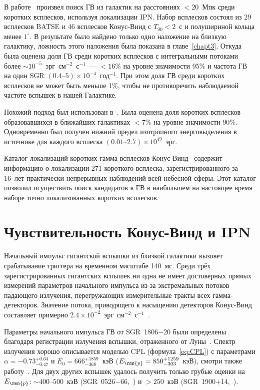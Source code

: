 В работе~\citep{Ofek2007} произвел поиск ГВ из галактик на расстояниях $<20$~Мпк 
среди коротких всплесков, используя локализации IPN. Набор всплесков состоял из 
29 всплесков BATSE и 46 всплесков Конус-Винд с $T_{90}<2$~с и полушириной кольца 
менее $1^{\circ}$. В результате было найдено только одно наложение на близкую 
галактику, ложность этого наложения была показана в главе~\ref{chapt3}. 
Откуда была оценена доля ГВ среди коротких всплесков с интегральными потоками 
более $\sim 10^{-5}$~эрг~см$^{-2}$~с$^{-1}$~--- $<16$\% на уровне значимости 95\% и частота ГВ 
на один SGR $(0.4\textrm{--}5)\times 10^{-4}$~год$^{-1}$. При этом доля ГВ среди 
коротких всплесков не может быть меньше 1\%, чтобы не противоречить наблюдаемой 
частоте вспышек в нашей Галактике. 

Похожий подход был использован в~\citep{Tikhomirova2010AstL}. Была оценена доля 
коротких всплесков образовавшихся в ближайших галактиках $<7$\% на уровне значимости 90\%. 
Одновременно был получен нижний предел изотропного энерговыделения в источнике 
для каждого всплеска $(0.01\textrm{--}2.7)\times 10^{49}$~эрг.

Каталог локализаций коротких гамма-всплесков Конус-Винд~\citep{Palshin2013} 
содержит информацию о локализации 271 короткого всплеска, зарегистрированного за 16~лет 
практически непрерывных наблюдений всей небесной сферы. Этот каталог позволил 
осуществить поиск кандидатов в ГВ в наибольшем на настоящее время наборе точно 
локализованных коротких всплесков.

\section{Чувствительность Конус-Винд и IPN}
Начальный импульс гигантской вспышки из близкой галактики вызовет срабатывание 
триггера на временном масштабе 140~мс. Среди трёх зарегистрированных гигантских 
вспышек ни одна не имеет достоверных прямых измерений параметров начального импульса 
из-за экстремальных потоков падающего излучения, перегружающих измерительные 
тракты всех гамма-детекторов. Значение потока, приводящего к насыщению детекторов 
Конус-Винд составляет примерно $2.4 \times 10^{-2}$~эрг~см$^{-2}$~с$^{-1}$~\citep{Mazets1999a}.

Параметры начального импульса ГВ от SGR~1806$-$20 были определены благодаря 
регистрации излучения вспышки, отраженного от Луны~\citep{Frederiks2007}. 
Спектр излучения хорошо описывается моделью CPL (формула~\ref{eq:CPL}) с параметрами
$\alpha=-0.73_{-0.47}^{+0.64}$ и $E_{0}=666^{+1859}_{-368}$~кэВ 
($E_{\rmn{p}}= 850^{+1259}_{-303}$~кэВ), смотри также работу~\citep{Terasawa2005}. 
Для двух других вспышек удалось получить только грубые оценки на $E_{\rmn{p}}$: 
$\sim 400\textrm{--}500$~кэВ (SGR~0526$-$66,~\citep{Golenetskii1979SvAL, Mazets1979}) 
и $>250$~кэВ (SGR~1900+14,~\citep{Hurley1999, Mazets1999}).

